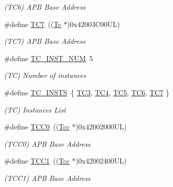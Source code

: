 \begin{DoxyCompactItemize}
\begin{DoxyCompactList}\small\item\em (T\+C6) A\+PB Base Address \end{DoxyCompactList}\item 
\#define \mbox{\hyperlink{group___s_a_m_d21_g15_l__base_ga4fa5926f55aa6ec5ad1d9dc393669a69}{T\+C7}}~((\mbox{\hyperlink{union_tc}{Tc}}       $\ast$)0x42003\+C00\+U\+L)
\begin{DoxyCompactList}\small\item\em (T\+C7) A\+PB Base Address \end{DoxyCompactList}\item 
\#define \mbox{\hyperlink{group___s_a_m_d21_g15_l__base_ga7895260bd2341a4b228dd6402c507c75}{T\+C\+\_\+\+I\+N\+S\+T\+\_\+\+N\+UM}}~5
\begin{DoxyCompactList}\small\item\em (TC) Number of instances \end{DoxyCompactList}\item 
\#define \mbox{\hyperlink{group___s_a_m_d21_g15_l__base_ga7661dbfecc08b2fb20b38c91004456f3}{T\+C\+\_\+\+I\+N\+S\+TS}}~\{ \mbox{\hyperlink{group___s_a_m_d21_j18_a__base_ga96dbeca00ecf683666f989fbc2425d89}{T\+C3}}, \mbox{\hyperlink{group___s_a_m_d21_j18_a__base_ga877f51fe7311fbc9c49c966ba738be05}{T\+C4}}, \mbox{\hyperlink{group___s_a_m_d21_j18_a__base_ga410ec3addea710896df03e12e3fb75da}{T\+C5}}, \mbox{\hyperlink{group___s_a_m_d21_j18_a__base_gae5a1efa96ea067fb3907f342aa6fb0a4}{T\+C6}}, \mbox{\hyperlink{group___s_a_m_d21_j18_a__base_ga4fa5926f55aa6ec5ad1d9dc393669a69}{T\+C7}} \}
\begin{DoxyCompactList}\small\item\em (TC) Instances List \end{DoxyCompactList}\item 
\#define \mbox{\hyperlink{group___s_a_m_d21_g15_l__base_ga99138b66570ac6a4b370ce5c3b52cd9f}{T\+C\+C0}}~((\mbox{\hyperlink{struct_tcc}{Tcc}}      $\ast$)0x42002000\+U\+L)
\begin{DoxyCompactList}\small\item\em (T\+C\+C0) A\+PB Base Address \end{DoxyCompactList}\item 
\#define \mbox{\hyperlink{group___s_a_m_d21_g15_l__base_gadd92e1743edad42328471d8ed6d00a6d}{T\+C\+C1}}~((\mbox{\hyperlink{struct_tcc}{Tcc}}      $\ast$)0x42002400\+U\+L)
\begin{DoxyCompactList}\small\item\em (T\+C\+C1) A\+PB Base Address \end{DoxyCompactList}\item 

\end{DoxyCompactItemize}
